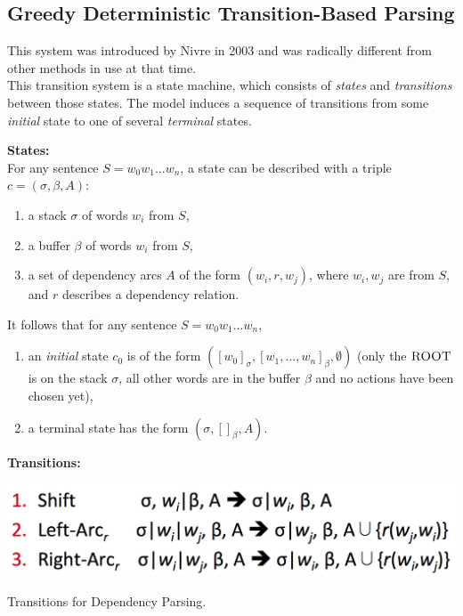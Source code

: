 \documentclass{tufte-handout}
\begin{document}
\subsection{Greedy Deterministic Transition-Based Parsing}
This system was introduced by Nivre in 2003 and was radically different from other methods in use at that time.\\
This transition system is a state machine, which consists of \textit{states} and  \textit{transitions} between those states.  The model induces a sequence of transitions from some \textit{initial} state to one of several \textit{terminal} states.

\textbf{States: }\\
For any sentence $S=w_0w_1...w_n$, a state can be described with a triple $c=(\sigma, \beta, A)$:
\begin{enumerate}
\item a stack $\sigma$ of words $w_i$ from $S$,
\item a buffer $\beta$ of words $w_i$ from $S$,
\item  a set of dependency arcs $A$ of the form $(w_i, r, w_j)$, where $w_i, w_j$ are from $S$, and $r$ describes a dependency relation.
\end{enumerate}
It follows that for any sentence $S=w_0w_1...w_n$,
\begin{enumerate}
\item an \textit{initial} state $c_0$ is of the form  $([ w_0]_{\sigma}, [w_1, ...,w_n]_{\beta}, \emptyset)$ (only the $\textsc{ROOT}$ is on the stack $\sigma$, all other words are in the buffer $\beta$ and no actions have been chosen yet),
\item a terminal state has the form $(\sigma, []_{\beta}, A)$.
\end{enumerate}

\textbf{Transitions:} \\

\begin{marginfigure}
	\centering
	\includegraphics[width=\linewidth]{transitions}
  \caption{Transitions for Dependency Parsing.}
  \label{fig:transitions}
\end{marginfigure}
\end{document}
